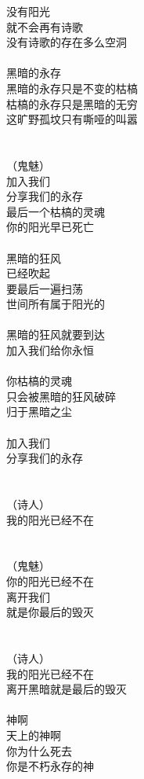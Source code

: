 没有阳光\\
就不会再有诗歌\\
没有诗歌的存在多么空洞\\
\\
黑暗的永存\\
黑暗的永存只是不变的枯槁\\
枯槁的永存只是黑暗的无穷\\
这旷野孤坟只有嘶哑的叫嚣\\
\\
\\
（鬼魅）\\
加入我们\\
分享我们的永存\\
最后一个枯槁的灵魂\\
你的阳光早已死亡\\
\\
黑暗的狂风\\
已经吹起\\
要最后一遍扫荡\\
世间所有属于阳光的\\
\\
黑暗的狂风就要到达\\
加入我们给你永恒\\
\\
你枯槁的灵魂\\
只会被黑暗的狂风破碎\\
归于黑暗之尘\\
\\
加入我们\\
分享我们的永存\\
\\
\\
（诗人）\\
我的阳光已经不在\\
\\
\\
（鬼魅）\\
你的阳光已经不在\\
离开我们\\
就是你最后的毁灭\\
\\
\\
（诗人）\\
我的阳光已经不在\\
离开黑暗就是最后的毁灭\\
\\
神啊\\
天上的神啊\\
你为什么死去\\
你是不朽永存的神\\
